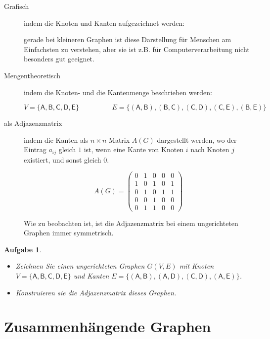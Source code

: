 \documentclass[12pt,a4paper]{report}
\theoremstyle{break}
\newtheorem{exercise}{Aufgabe}[section]
\theoremstyle{plain}
\begin{document}
\begin{description}
\item[Grafisch] indem die Knoten und Kanten aufgezeichnet werden:


gerade bei kleineren Graphen ist diese Darstellung f\"{u}r Menschen am
Einfachsten zu verstehen, aber sie ist z.B. f\"{u}r
Computerverarbeitung nicht besonders gut geeignet.
\item[Mengentheoretisch] indem die Knoten- und die Kantenmenge
  beschrieben werden:

\begin{displaymath}
V = \{\mathsf{A,B,C,D,E}\}\hspace{2cm}E = \{\mathsf{(A,B), (B,C),
  (C,D), (C,E), (B,E)}\}
\end{displaymath}

\item[\textnormal{als} Adjazenzmatrix] indem die Kanten als $n\times{n}$ Matrix $A(G)$
  dargestellt werden, wo der Eintrag $a_{ij}$ gleich $1$ ist, wenn eine Kante
  von Knoten $i$ nach Knoten $j$ existiert, und sonst gleich $0$.

\begin{displaymath}
A(G) = \left( 
\begin{array}{ccccc}
0 & 1 & 0 & 0 & 0 \\
1 & 0 & 1 & 0 & 1 \\
0 & 1 & 0 & 1 & 1 \\
0 & 0 & 1 & 0 & 0 \\
0 & 1 & 1 & 0 & 0 
\end{array}
\right)
\end{displaymath}

Wie zu beobachten ist, ist die Adjazenzmatrix bei einem ungerichteten
Graphen immer symmetrisch.
\end{description}

\begin{exercise}\label{exrep}
\begin{itemize}
\item Zeichnen Sie einen ungerichteten Graphen $G(V,E)$ mit Knoten 
$V = \{\mathsf{A,B,C,D,E}\}$ und Kanten 
$E = \{\mathsf{(A, B), (A, D), (C, D), (A, E)}\}$.
\item Konstruieren sie die Adjazenzmatrix dieses Graphen.
\end{itemize}
\end{exercise}

\section{Zusammenh\"{a}ngende Graphen}
\end{document}
